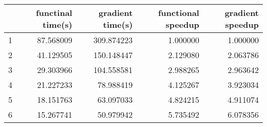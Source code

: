 \begin{tabular}{lrrrr}
\toprule
{} &  functinal time(s) &  gradient time(s) &  functional speedup &  gradient speedup \\
\midrule
1 &          87.568009 &        309.874223 &            1.000000 &          1.000000 \\
2 &          41.129505 &        150.148447 &            2.129080 &          2.063786 \\
3 &          29.303966 &        104.558581 &            2.988265 &          2.963642 \\
4 &          21.227233 &         78.988419 &            4.125267 &          3.923034 \\
5 &          18.151763 &         63.097033 &            4.824215 &          4.911074 \\
6 &          15.267741 &         50.979942 &            5.735492 &          6.078356 \\
\bottomrule
\end{tabular}
